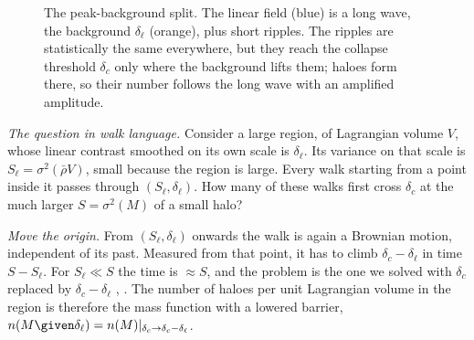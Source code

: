 \begin{figure}[htbp]
\centering
{}
\caption{The peak-background split. The linear field (blue) is a long wave, the
background $\delta_\ell$ (orange), plus short ripples. The ripples are statistically
the same everywhere, but they reach the collapse threshold $\delta_c$ only where
the background lifts them; haloes form there, so their number follows the long wave
with an amplified amplitude.}
\label{11b:fig:pbs}
\end{figure}

\emph{The question in walk language.} Consider a large region, of Lagrangian
volume $V$, whose linear contrast smoothed on its own scale is $\delta_\ell$. Its
variance on that scale is $S_\ell=\sigma^2(\bar\rho V)$, small because the region is
large. Every walk starting from a point inside it passes through
$(S_\ell,\delta_\ell)$. How many of these walks first cross $\delta_c$ at the much
larger $S=\sigma^2(M)$ of a small halo?

\emph{Move the origin.} From $(S_\ell,\delta_\ell)$ onwards the walk is again a
Brownian motion, independent of its past. Measured from that point, it has to
climb $\delta_c-\delta_\ell$ in time $S-S_\ell$. For $S_\ell\ll S$ the time is
$\approx S$, and the problem is the one we solved with $\delta_c$ replaced by
$\delta_c-\delta_\ell$ , .
The number of haloes per unit Lagrangian volume in the region is therefore the
mass function with a lowered barrier, $n(M\given\delta_\ell)=n(M)|_{\delta_c\to\delta_c-\delta_\ell}$.

